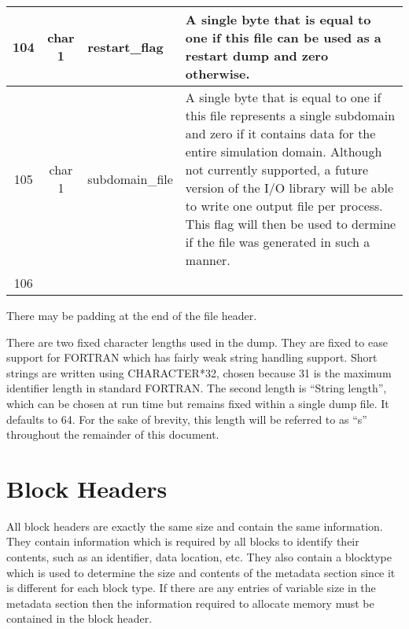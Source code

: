 \documentclass[12pt]{article}
\newcommand{\subsec}{\section}
\begin{document}
\begin{center}
\begin{tabularx}{0.9\textwidth}[!hbt]{cclX}
  104 & char 1 & restart\_flag & A single byte that is equal to one if this
  file can be used as a restart dump and zero otherwise.
  \\\midrule

  105 & char 1 & subdomain\_file & A single byte that is equal to one if this
  file represents a single subdomain and zero if it contains data for the
  entire simulation domain. Although not currently supported, a future version
  of the I/O library will be able to write one output file per process. This
  flag will then be used to dermine if the file was generated in such a manner.
  \\\midrule

  106 &
\end{tabularx}
\end{center}\vspace{10pt}

There may be padding at the end of the file header.

There are two fixed character lengths used in the dump. They are fixed to
ease support for FORTRAN which has fairly weak string handling support.
Short strings are written using CHARACTER*32, chosen because 31 is the
maximum identifier length in standard FORTRAN. The second length is
``String length'', which can be chosen at run time but remains fixed
within a single dump file. It defaults to 64.
For the sake of brevity, this length will be referred to as ``s'' throughout
the remainder of this document.

\subsec{Block Headers}
All block headers are exactly the same size and contain the same information.
They contain information which is required by all blocks to identify
their contents, such as an identifier, data location, etc.
They also contain a blocktype which is used to determine the size and contents
of the metadata section since it is different for each block type.
If there are any entries of variable size in the metadata section then the
information required to allocate memory must be contained in the block header.\\
\end{document}
